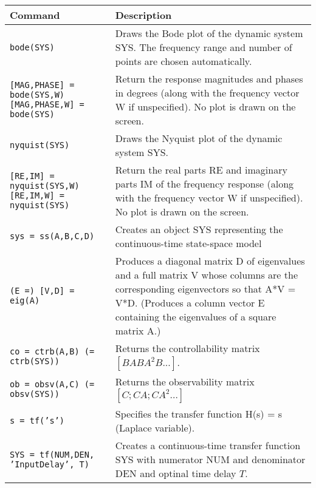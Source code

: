 \begin{center}
    \def\arraystretch{1.5}
    \begin{tabular}{p{5cm}|p{8cm}}
        \textbf{Command}    &   \textbf{Description}\\
        \hline
        \texttt{bode(SYS)}  &  Draws the Bode plot of the dynamic system SYS. The frequency range and number of points are chosen automatically.\\
        
        \texttt{[MAG,PHASE] = bode(SYS,W) [MAG,PHASE,W] = bode(SYS)} & Return the response magnitudes and phases in degrees (along with the frequency vector W if unspecified).  No plot is drawn on the screen. \\
        
        \texttt{nyquist(SYS)}  &  Draws the Nyquist plot of the dynamic system SYS. \\
        
        \texttt{[RE,IM] = nyquist(SYS,W) [RE,IM,W] = nyquist(SYS)} & Return the real parts RE and imaginary parts IM of the frequency response (along with the frequency vector W if unspecified).  No plot is drawn on the screen. \\
        
        \texttt{sys = ss(A,B,C,D)}  & Creates an object SYS representing the continuous-time state-space model \\
        
        \texttt{(E =) [V,D] = eig(A)}  &  Produces a diagonal matrix D of eigenvalues and a full matrix V whose columns are the corresponding eigenvectors so that A*V = V*D. (Produces a column vector E containing the eigenvalues of a square matrix A.)\\
        
        \texttt{co = ctrb(A,B) (= ctrb(SYS))}  & Returns the controllability matrix $[B AB A^2B ...]$.  \\
        
        \texttt{ob = obsv(A,C) (= obsv(SYS))}  & Returns the observability matrix $[C; CA; CA^2 ...]$ \\
        
        \texttt{s = tf('s')}  & Specifies the transfer function H(s) = s (Laplace variable). \\
        
        \texttt{SYS = tf(NUM,DEN, 'InputDelay', T)} & Creates a continuous-time transfer function SYS with numerator NUM and denominator DEN and optinal time delay $T$.\\
        

\end{tabular}
\end{center}
